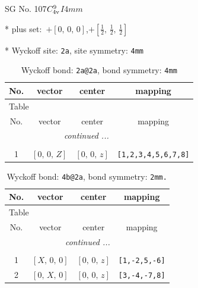\documentclass[fleqn,8pt]{jsarticle}
\begin{document}
\setcounter{MaxMatrixCols}{32}

\renewcommand{\tablename}{Table~}
\renewcommand{\figurename}{Figure~}
\begin{center}
\LARGE
SG No. 107\quad$C_{\rm 4v}^{9}$\quad$I4mm$\quad[ tetragonal ]
\end{center}

* plus set:\,\,\,$+\left[ 0,\, 0,\, 0 \right]$,\quad $+\left[ \frac{1}{2},\, \frac{1}{2},\, \frac{1}{2} \right]$


* Wyckoff site: {\tt 2a}, site symmetry: {\tt 4mm}
\renewcommand{\arraystretch}{1.2}
\begin{longtable}{cccc}
\caption{Wyckoff bond: {\tt 2a@2a}, bond symmetry: {\tt 4mm}}
 \\
 \hline \hline
No. & vector & center & mapping \\ \hline \endfirsthead

\multicolumn{3}{l}{\tablename\ \thetable{}} \\
 \hline \hline
No. & vector & center & mapping \\ \hline \endhead

 \hline \hline
\multicolumn{3}{r}{\footnotesize\it continued ...} \\ \endfoot

 \hline \hline
\multicolumn{3}{r}{} \\ \endlastfoot

1 & $\left[ 0,\, 0,\, Z \right]$ & $\left[ 0,\, 0,\, z \right]$ & {\tt [1,2,3,4,5,6,7,8]} \\
\end{longtable}
\renewcommand{\arraystretch}{1.2}
\begin{longtable}{cccc}
\caption{Wyckoff bond: {\tt 4b@2a}, bond symmetry: {\tt 2mm.}}
 \\
 \hline \hline
No. & vector & center & mapping \\ \hline \endfirsthead

\multicolumn{3}{l}{\tablename\ \thetable{}} \\
 \hline \hline
No. & vector & center & mapping \\ \hline \endhead

 \hline \hline
\multicolumn{3}{r}{\footnotesize\it continued ...} \\ \endfoot

 \hline \hline
\multicolumn{3}{r}{} \\ \endlastfoot

1 & $\left[ X,\, 0,\, 0 \right]$ & $\left[ 0,\, 0,\, z \right]$ & {\tt [1,-2,5,-6]} \\ \hline
2 & $\left[ 0,\, X,\, 0 \right]$ & $\left[ 0,\, 0,\, z \right]$ & {\tt [3,-4,-7,8]} \\
\end{longtable}
\end{document}
